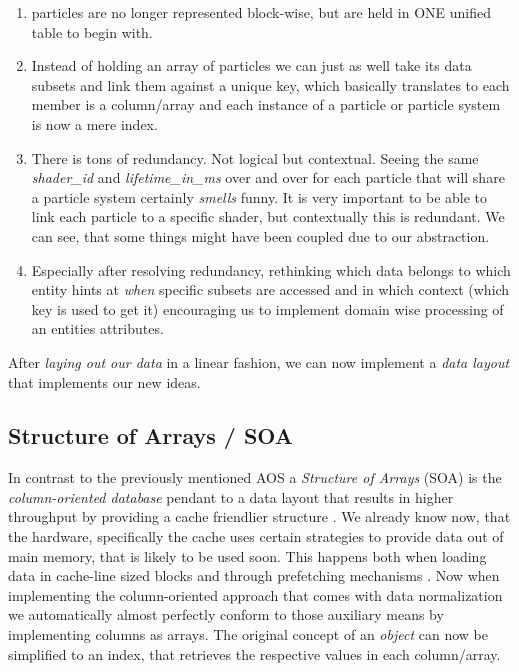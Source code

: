 \begin{enumerate}
	\item particles are no longer represented block-wise, but are held in ONE unified table to begin with.
	\item Instead of holding an array of particles we can just as well take its data subsets and link them against a unique key, which basically translates to each member is a column/array and each instance of a particle or particle system is now a mere index.
	\item There is tons of redundancy. Not logical but contextual. Seeing the same \textit{shader\_id} and \textit{lifetime\_in\_ms} over and over for each particle that will share a particle system certainly \textit{smells} funny. It is very important to be able to link each particle to a specific shader, but contextually this is redundant. We can see, that some things might have been coupled due to our abstraction.
	\item Especially after resolving redundancy, rethinking which data belongs to which entity hints at \textit{when} specific subsets are accessed and in which context (which key is used to get it) encouraging us to implement domain wise processing of an entities attributes.
\end{enumerate}
After \textit{laying out our data} in a linear fashion, we can now implement a \textit{data layout} that implements our new ideas.

\subsection{Structure of Arrays / SOA}\label{soa}
In contrast to the previously mentioned AOS  a \textit{Structure of Arrays} (SOA) is the \textit{column-oriented database} pendant to a data layout that results in higher throughput by providing a cache friendlier structure . We already know now, that the hardware, specifically the cache uses certain strategies to provide data out of main memory, that is likely to be used soon. This happens both when loading data in cache-line sized blocks and through prefetching mechanisms . Now when implementing the column-oriented approach that comes with data normalization we automatically almost perfectly conform to those auxiliary means by implementing columns as arrays. The original concept of an \textit{object} can now be simplified to an index, that retrieves the respective values in each column/array.\newpage
